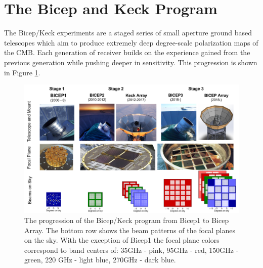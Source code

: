 \documentclass[12pt]{article}
\begin{document}
\section{The Bicep and Keck Program}
The Bicep/Keck experiments are a staged series of small aperture ground based
telescopes which aim to produce extremely deep degree-scale polarization maps
of the CMB. Each generation of receiver builds on the experience gained from
the previous generation while pushing deeper in sensitivity. This progression
is shown in Figure \ref{fig:BK_progression}.
\begin{figure}
	\center
	\includegraphics[width=.8\textwidth]{BK_progression.png}
	\caption{The progression of the Bicep/Keck program from Bicep1 to Bicep
	Array. The bottom row shows the beam patterns of the focal planes on the
	sky. With the exception of Bicep1 the focal plane colors correspond to
	band centers of: 35GHz - pink, 95GHz - red, 150GHz - green, 220 GHz -
	light blue, 270GHz - dark blue.}
	\label{fig:BK_progression}
\end{figure}
\end{document}
